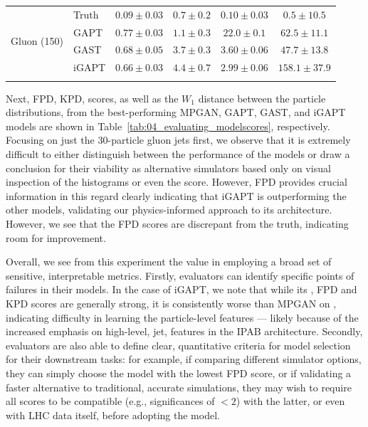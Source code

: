 \begin{table}[ht!]
{\begin{tabular}{l|lcccc}
        \multirow{4}{*}{Gluon (150)}
        & Truth & $0.09 \pm 0.03$ & $0.7 \pm 0.2$ & $0.10 \pm 0.03$ & $0.5 \pm 10.5$\\
        & GAPT & $0.77 \pm 0.03$ & $\mathbf{1.1 \pm 0.3}$ & $22.0 \pm 0.1$ & $62.5 \pm 11.1$\\
        & GAST & $0.68 \pm 0.05$ & $3.7 \pm 0.3$ & $3.60 \pm 0.06$ & $\mathbf{47.7 \pm 13.8}$\\
        & iGAPT & $\mathbf{0.66 \pm 0.03}$ & $4.4 \pm 0.7$ & $\mathbf{2.99 \pm 0.06}$ & $158.1 \pm 37.9$\\
        \cbottomrule
    \end{tabular}
    }
\end{table}

Next, FPD, KPD, \wassm scores, as well as the $W_1$ distance between the particle \ptrel distributions, from the best-performing MPGAN, GAPT, GAST, and iGAPT models are shown in Table~\ref{tab:04_evaluating_modelscores}, respectively.
Focusing on just the 30-particle gluon jets first, we observe that it is extremely difficult to either distinguish between the performance of the models or draw a conclusion for their viability as alternative simulators based only on visual inspection of the histograms or even the \wassm score.
However, FPD provides crucial information in this regard clearly indicating that iGAPT is outperforming the other models, validating our physics-informed approach to its architecture.
However, we see that the FPD scores are discrepant from the truth, indicating room for improvement.

Overall, we see from this experiment the value in employing a broad set of sensitive, interpretable metrics.
Firstly, evaluators can identify specific points of failures in their models.
In the case of iGAPT, we note that while its \wassm, FPD and KPD scores are generally strong, it is consistently worse than MPGAN on \wassppt, indicating difficulty in learning the particle-level features --- likely because of the increased emphasis on high-level, jet, features in the IPAB architecture.
Secondly, evaluators are also able to define clear, quantitative criteria for model selection for their downstream tasks: for example, if comparing different simulator options, they can simply choose the model with the lowest FPD score, or if validating a faster alternative to traditional, accurate simulations, they may wish to require all scores to be compatible (e.g., significances of $<2$) with the latter, or even with LHC data itself, before adopting the model.

